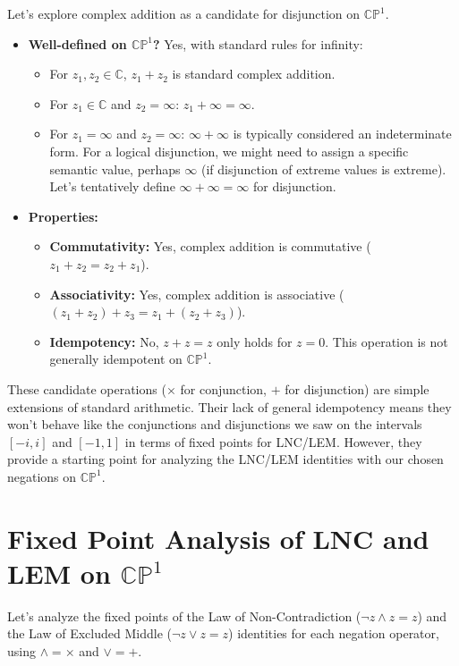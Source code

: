 \documentclass{article}
\begin{document}
	Let's explore complex addition as a candidate for disjunction on $\mathbb{CP}^1$.
	
	\begin{itemize}
		\item \textbf{Well-defined on $\mathbb{CP}^1$?} Yes, with standard rules for infinity:
		\begin{itemize}
			\item For $z_1, z_2 \in \mathbb{C}$, $z_1 + z_2$ is standard complex addition.
			\item For $z_1 \in \mathbb{C}$ and $z_2 = \infty$: $z_1 + \infty = \infty$.
			\item For $z_1 = \infty$ and $z_2 = \infty$: $\infty + \infty$ is typically considered an indeterminate form. For a logical disjunction, we might need to assign a specific semantic value, perhaps $\infty$ (if disjunction of extreme values is extreme). Let's tentatively define $\infty + \infty = \infty$ for disjunction.
		\end{itemize}
		
		\item \textbf{Properties:}
		\begin{itemize}
			\item \textbf{Commutativity:} Yes, complex addition is commutative ($z_1 + z_2 = z_2 + z_1$).
			\item \textbf{Associativity:} Yes, complex addition is associative ($(z_1 + z_2) + z_3 = z_1 + (z_2 + z_3)$).
			\item \textbf{Idempotency:} No, $z + z = z$ only holds for $z = 0$. This operation is not generally idempotent on $\mathbb{CP}^1$.
		\end{itemize}
	\end{itemize}
	These candidate operations ($\times$ for conjunction, $+$ for disjunction) are simple extensions of standard arithmetic. Their lack of general idempotency means they won't behave like the conjunctions and disjunctions we saw on the intervals $[-i, i]$ and $[-1, 1]$ in terms of fixed points for LNC/LEM. However, they provide a starting point for analyzing the LNC/LEM identities with our chosen negations on $\mathbb{CP}^1$.
	
	\section{Fixed Point Analysis of LNC and LEM on $\mathbb{CP}^1$}
	
	Let's analyze the fixed points of the Law of Non-Contradiction ($\neg z \wedge z = z$) and the Law of Excluded Middle ($\neg z \vee z = z$) identities for each negation operator, using $\wedge = \times$ and $\vee = +$.
	
\end{document}

